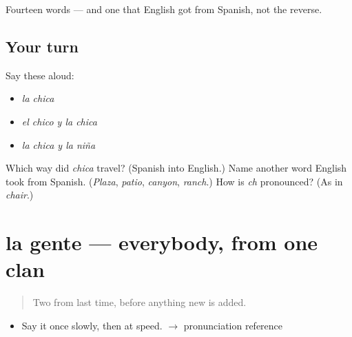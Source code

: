 \begin{grammarlens}[title={What you've built}]
Fourteen words --- and one that English got from Spanish, not the reverse.
\end{grammarlens}

\subsection*{Your turn}
Say these aloud:

\begin{itemize}
\raggedright
  \item \emph{la chica}
  \item \emph{el chico y la chica}
  \item \emph{la chica y la niña}
\end{itemize}

\begin{tcolorbox}[breakable,colback=teal!4,colframe=teal!35!black,title={Before you move on}]
Which way did \emph{chica} travel? (Spanish into English.) Name another word English took from Spanish. (\emph{Plaza}, \emph{patio}, \emph{canyon}, \emph{ranch}.) How is \emph{ch} pronounced? (As in \emph{chair}.)
\end{tcolorbox}
\section[la gente]{la gente --- everybody, from one clan}

\label{lesson:ES-C308-gente}



\begin{quote}
Two from last time, before anything new is added.
\end{quote}

\begin{sounds}
\begin{itemize}
\raggedright
  \item Say it once slowly, then at speed. $\to$ pronunciation reference
\end{itemize}
\end{sounds}

